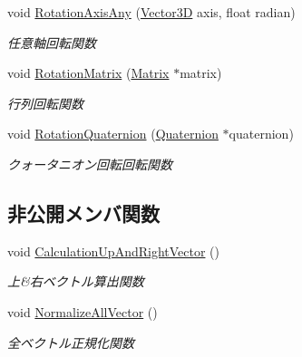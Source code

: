 \begin{DoxyCompactItemize}
void \mbox{\hyperlink{class_axis_a02f95ead5d71cf4f4a38b6a9f9d19caa}{Rotation\+Axis\+Any}} (\mbox{\hyperlink{class_vector3_d}{Vector3D}} axis, float radian)
\begin{DoxyCompactList}\small\item\em 任意軸回転関数 \end{DoxyCompactList}\item 
void \mbox{\hyperlink{class_axis_a3fd6433b4949d4e826d51c1b3a812771}{Rotation\+Matrix}} (\mbox{\hyperlink{class_matrix}{Matrix}} $\ast$matrix)
\begin{DoxyCompactList}\small\item\em 行列回転関数 \end{DoxyCompactList}\item 
void \mbox{\hyperlink{class_axis_a0c12edd6d56e298b41b0a20ef2cacceb}{Rotation\+Quaternion}} (\mbox{\hyperlink{_vector3_d_8h_a3ee38c9c46d9851e33a9a1113328dafc}{Quaternion}} $\ast$quaternion)
\begin{DoxyCompactList}\small\item\em クォータニオン回転回転関数 \end{DoxyCompactList}\end{DoxyCompactItemize}
\subsection*{非公開メンバ関数}
\begin{DoxyCompactItemize}
\item 
void \mbox{\hyperlink{class_axis_af27bd2cc59e50b8a7256434cd4214c2b}{Calculation\+Up\+And\+Right\+Vector}} ()
\begin{DoxyCompactList}\small\item\em 上\&右ベクトル算出関数 \end{DoxyCompactList}\item 
void \mbox{\hyperlink{class_axis_a2f996a45ce7884ae66ced29c33e9e2fb}{Normalize\+All\+Vector}} ()
\begin{DoxyCompactList}\small\item\em 全ベクトル正規化関数 \end{DoxyCompactList}\end{DoxyCompactItemize}
